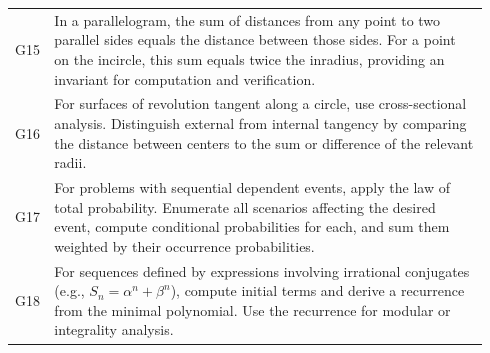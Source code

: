 \documentclass{article}
\theoremstyle{plain}
\theoremstyle{definition}
\theoremstyle{remark}
\begin{document}
\begin{table}[h]
\begin{tabular}{p{0.04\linewidth} p{0.9\linewidth}}
G15 & In a parallelogram, the sum of distances from any point to two parallel sides equals the distance between those sides. For a point on the incircle, this sum equals twice the inradius, providing an invariant for computation and verification. \\

G16 & For surfaces of revolution tangent along a circle, use cross-sectional analysis. Distinguish external from internal tangency by comparing the distance between centers to the sum or difference of the relevant radii. \\

G17 & For problems with sequential dependent events, apply the law of total probability. Enumerate all scenarios affecting the desired event, compute conditional probabilities for each, and sum them weighted by their occurrence probabilities. \\

G18 & For sequences defined by expressions involving irrational conjugates (e.g., \(S_n=\alpha^n+\beta^n\)), compute initial terms and derive a recurrence from the minimal polynomial. Use the recurrence for modular or integrality analysis. \\
\bottomrule
\end{tabular}
\vspace{-50pt}
\end{table}
\end{document}
